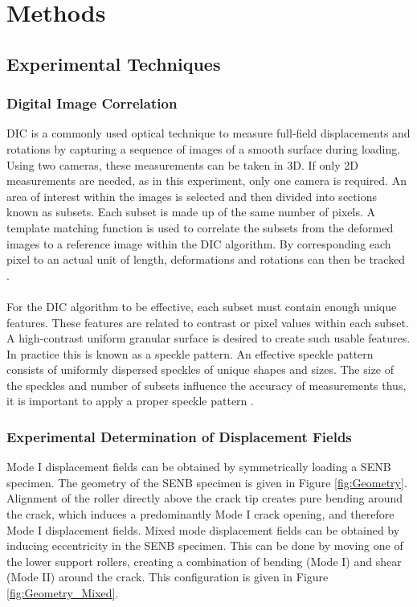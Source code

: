 \documentclass[12pt]{article}
\begin{document}
\section{Methods}

\subsection{Experimental Techniques} 

\subsubsection{Digital Image Correlation} %
DIC is a commonly used optical technique to measure full-field displacements and rotations by capturing a sequence of images of a smooth surface during loading. Using two cameras, these measurements can be taken in 3D. If only 2D measurements are needed, as in this experiment, only one camera is required. An area of interest within the images is selected and then divided into sections known as subsets. Each subset is made up of the same number of pixels. A template matching function is used to correlate the subsets from the deformed images to a reference image within the DIC algorithm. By corresponding each pixel to an actual unit of length, deformations and rotations can then be tracked \cite{DIC}.
\\
\\
For the DIC algorithm to be effective, each subset must contain enough unique features. These features are related to contrast or pixel values within each subset. A high-contrast uniform granular surface is desired to create such usable features. In practice this is known as a speckle pattern. An effective speckle pattern consists of uniformly dispersed speckles of unique shapes and sizes. The size of the speckles and number of subsets influence the accuracy of measurements thus, it is important to apply a proper speckle pattern \cite{speckle}.  

\subsubsection{Experimental Determination of Displacement Fields} %
Mode I displacement fields can be obtained by symmetrically loading a SENB specimen. The geometry of the SENB specimen is given in Figure \ref{fig:Geometry}. Alignment of the roller directly above the crack tip creates pure bending around the crack, which induces a predominantly Mode I crack opening, and therefore Mode I displacement fields. Mixed mode displacement fields can be obtained by inducing eccentricity in the SENB specimen. This can be done by moving one of the lower support rollers, creating a combination of bending (Mode I) and shear (Mode II) around the crack. This configuration is given in Figure \ref{fig:Geometry_Mixed}.  
\end{document}
